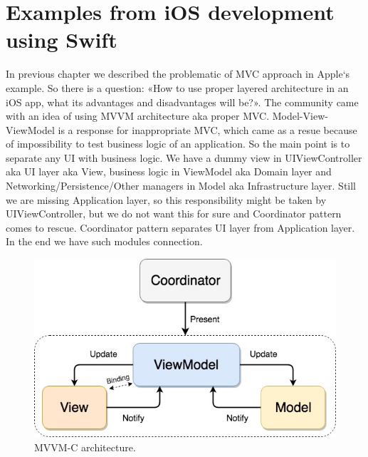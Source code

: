 \section{Examples from iOS development using Swift}\label{sec:03}

In previous chapter we described the problematic of MVC approach in Apple`s example. So there is a question: «How to use proper layered architecture in an iOS app, what its advantages and disadvantages will be?». The community came with an idea of using MVVM architecture aka proper MVC. Model-View-ViewModel is a response for inappropriate MVC, which came as a resue because of impossibility to test business logic of an application. So the main point is to separate any UI with business logic. We have a dummy view in UIViewController aka UI layer aka View, business logic in ViewModel aka Domain layer and Networking/Persistence/Other managers in Model aka Infrastructure layer. Still we are missing Application layer, so this responsibility might be taken by UIViewController, but we do not want this for sure and Coordinator pattern comes to rescue. Coordinator pattern separates UI layer from Application layer. In the end we have such modules connection.
\begin{figure}[!htbp]
	\centering
	\includegraphics[width=0.95\linewidth]{sections/02-chapter/images/Coordinator.jpg}
	\caption{MVVM-C architecture.}\label{sec:02_01:fig:02}
	\end{figure}
    

